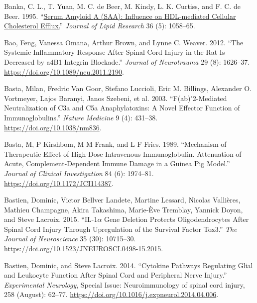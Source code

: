 \documentclass[9pt,lineno]{elife}
\newlength{\cslhangindent}
\newlength{\cslentryspacingunit} %
\newenvironment{CSLReferences}[2] %
 {%
  \setlength{\parindent}{0pt}
  \ifodd #1
  \let\oldpar\par
  \def\par{\hangindent=\cslhangindent\oldpar}
  \fi
  \setlength{\parskip}{#2\cslentryspacingunit}
 }%
 {}
\begin{document}
\begin{CSLReferences}{1}{0}
\leavevmode{}%
Banka, C. L., T. Yuan, M. C. de Beer, M. Kindy, L. K. Curtiss, and F. C. de Beer. 1995. {``\href{https://www.ncbi.nlm.nih.gov/pubmed/7658153}{Serum Amyloid {A} ({SAA}): Influence on {HDL-mediated} Cellular Cholesterol Efflux.}''} \emph{Journal of Lipid Research} 36 (5): 1058--65.

\leavevmode{}%
Bao, Feng, Vanessa Omana, Arthur Brown, and Lynne C. Weaver. 2012. {``The Systemic Inflammatory Response After Spinal Cord Injury in the Rat Is Decreased by {a4B1} Integrin Blockade.''} \emph{Journal of Neurotrauma} 29 (8): 1626--37. \url{https://doi.org/10.1089/neu.2011.2190}.

\leavevmode{}%
Basta, Milan, Fredric Van Goor, Stefano Luccioli, Eric M. Billings, Alexander O. Vortmeyer, Lajos Baranyi, Janos Szebeni, et al. 2003. {``F(ab){\({'}\)}2-Mediated Neutralization of {C3a} and {C5a} Anaphylatoxins: A Novel Effector Function of Immunoglobulins.''} \emph{Nature Medicine} 9 (4): 431--38. \url{https://doi.org/10.1038/nm836}.

\leavevmode{}%
Basta, M, P Kirshbom, M M Frank, and L F Fries. 1989. {``Mechanism of Therapeutic Effect of High-Dose Intravenous Immunoglobulin. {Attenuation} of Acute, Complement-Dependent Immune Damage in a Guinea Pig Model.''} \emph{Journal of Clinical Investigation} 84 (6): 1974--81. \url{https://doi.org/10.1172/JCI114387}.

\leavevmode{}%
Bastien, Dominic, Victor Bellver Landete, Martine Lessard, Nicolas Vallières, Mathieu Champagne, Akira Takashima, Marie-Ève Tremblay, Yannick Doyon, and Steve Lacroix. 2015. {``{IL-1\(\alpha\) Gene Deletion Protects Oligodendrocytes} After {Spinal Cord Injury} Through {Upregulation} of the {Survival Factor Tox3}.''} \emph{The Journal of Neuroscience} 35 (30): 10715--30. \url{https://doi.org/10.1523/JNEUROSCI.0498-15.2015}.

\leavevmode{}%
Bastien, Dominic, and Steve Lacroix. 2014. {``Cytokine Pathways Regulating Glial and Leukocyte Function After Spinal Cord and Peripheral Nerve Injury.''} \emph{Experimental Neurology}, Special {Issue}: {Neuroimmunology} of spinal cord injury, 258 (August): 62--77. \url{https://doi.org/10.1016/j.expneurol.2014.04.006}.


\end{CSLReferences}
\end{document}
